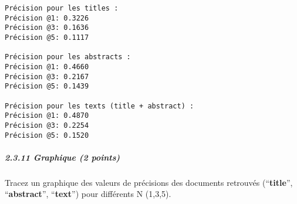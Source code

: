 \documentclass[11pt]{article}
\begin{document}
    \begin{Verbatim}[commandchars=\\\{\}]
Précision pour les titles :
Précision @1: 0.3226
Précision @3: 0.1636
Précision @5: 0.1117

Précision pour les abstracts :
Précision @1: 0.4660
Précision @3: 0.2167
Précision @5: 0.1439

Précision pour les texts (title + abstract) :
Précision @1: 0.4870
Précision @3: 0.2254
Précision @5: 0.1520
    \end{Verbatim}

    \subparagraph{2.3.11 Graphique (2 points)}\label{graphique-2-points}

Tracez un graphique des valeurs de précisions des documents retrouvés
(``\textbf{title}'', ``\textbf{abstract}'', ``\textbf{text}'') pour
différents N (1,3,5).
\end{document}
